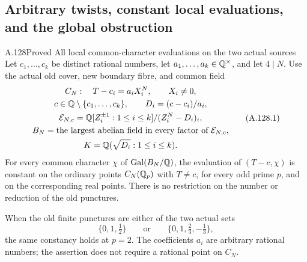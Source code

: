 \subsection{Arbitrary twists, constant local evaluations, and the global obstruction}

\begin{statement}{A.128}{Proved}
{All local common-character evaluations on the two actual sources}
Let $c_1,\ldots,c_k$ be distinct rational numbers, let
$a_1,\ldots,a_k\in\mathbb Q^\times$, and let $4\mid N$.
Use the actual old cover, new boundary fibre, and common field
\[
 \begin{gathered}
 C_N:\quad T-c_i=a_iX_i^N,\qquad X_i\ne0,\\
 c\in\mathbb Q\setminus\{c_1,\ldots,c_k\},\qquad
 D_i=(c-c_i)/a_i,\\
 \mathcal E_{N,c}
   =\mathbb Q[Z_i^{\pm1}:1\le i\le k]/(Z_i^N-D_i)_i,\\
 B_N=\text{the largest abelian field in every factor of }\mathcal E_{N,c},\\
 K=\mathbb Q(\sqrt{D_i}:1\le i\le k).
 \end{gathered}
\tag{A.128.1}
\]
For every common character $\chi$ of
$\operatorname{Gal}(B_N/\mathbb Q)$, the evaluation of
$(T-c,\chi)$ is constant on the ordinary points
$C_N(\mathbb Q_p)$ with $T\ne c$, for every odd prime $p$,
and on the corresponding real points.
There is no restriction on the number or reduction of the old punctures.

When the old finite punctures are either of the two actual sets
\[
       \{0,1,\tfrac12\}
             \qquad\text{or}\qquad
       \{0,1,\tfrac23,-\tfrac13\},
\tag{A.128.2}
\]
the same constancy holds at $p=2$.
The coefficients $a_i$ are arbitrary rational numbers;
the assertion does not require a rational point on $C_N$.


\end{statement}
